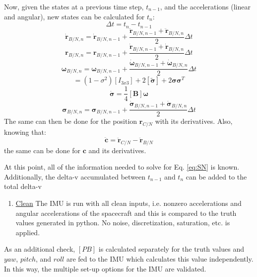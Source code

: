 Now, given the states at a previous time step, $t_{n-1}$, and the accelerations (linear and angular), new states can be calculated for $t_n$:
\begin{equation}
	\Delta t = t_{n} - t_{n-1}
\end{equation}
\begin{equation}
\dot{\bm{r}}_{B/N,n} = \dot{\bm{r}}_{B/N,n-1} + \frac{\ddot{\bm{r}}_{B/N,n-1}+\ddot{\bm{r}}_{B/N,n}}{2} \Delta t
\end{equation}
\begin{equation}
	\bm{r}_{B/N,n} = \bm{r}_{B/N,n-1} + \frac{\dot{\bm{r}}_{B/N,n-1}+\dot{\bm{r}}_{B/N,n}}{2} \Delta t
\end{equation}
\begin{equation}
\bm{\omega}_{B/N,n} = \bm{\omega}_{B/N,n-1} + \frac{\dot{\bm{\omega}}_{B/N,n-1}+\dot{\bm{\omega}}_{B/N,n}}{2} \Delta t
\end{equation}
\begin{equation}
[\bm{B}] = (1-\sigma^2)[I_{3x3}]+2[\tilde{\bm{\sigma}}] + 2\bm{\sigma}\bm{\sigma}^T
\end{equation}
\begin{equation}
	\bm{\dot{\sigma}} = \frac{1}{4} [\bm{B}] \bm{\omega}
\end{equation}
\begin{equation}
\bm{\sigma}_{B/N,n} = \bm{\sigma}_{B/N,n-1} + \frac{\dot{\bm{\sigma}}_{B/N,n-1}+\dot{\bm{\sigma}}_{B/N,n}}{2} \Delta t
\end{equation}
The same can then be done for the position $ {\bm{r}}_{C/N}$ with its derivatives. Also, knowing that:
\begin{equation}
\ddot{\bm{c}} = \ddot{\bm{r}}_{C/N} - \ddot{\bm{r}}_{B/N}
\end{equation}
the same can be done for $\bm{c}$ and its derivatives. 

At this point, all of the information needed to solve for Eq. \ref{eq:SN} is known. Additionally, the delta-v accumulated between $t_{n-1}$ and $t_{n}$ can be added to the total delta-v

\begin{enumerate}
	\item \underline{Clean} The IMU is run with all clean inputs, i.e. nonzero accelerations and angular accelerations of the spacecraft and this is compared to the truth values generated in python. No noise, discretization, saturation, etc. is applied.
\end{enumerate} 
As an additional check, $[PB]$ is calculated separately for the truth values and $yaw$, $pitch$, and $roll$ are fed to the IMU which calculates this value independently. In this way, the multiple set-up options for the IMU are validated.


